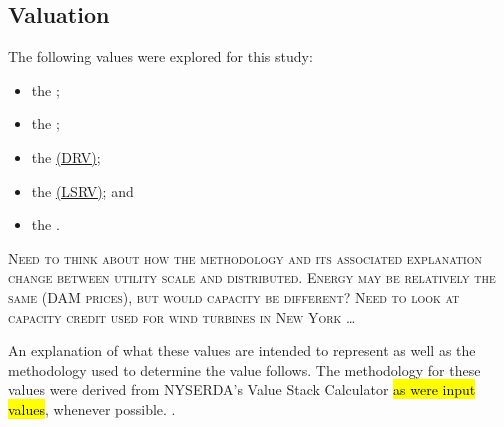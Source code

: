 
\subsection{Valuation}
\label{meth_val}
The following values were explored for this study: 

\begin{itemize}
	\item the \hyperref[meth_val_aev]{\aev{}}; 
	\item the \hyperref[meth_val_aciv]{\aciv{}}; 
	\item the \hyperref[meth_val_drv]{\drv{} (DRV)};
	\item the \hyperref[meth_val_lsrv]{\lsrv{} (LSRV)}; and 
	\item the \hyperref[meth_val_atdlv]{\atdlv{}}. 
\end{itemize}

\vspace*{10mm}
\begin{centering}
\large\textsc{Need to think about how the methodology and its associated explanation change between utility scale and distributed. Energy may be relatively the same (DAM prices), but would capacity be different? Need to look at capacity credit used for wind turbines in New York \ldots}
\end{centering}
\vspace*{10mm}

An explanation of what these values are intended to represent as well as the methodology used to determine the value follows. The methodology for these values were derived from NYSERDA’s Value Stack Calculator \hl{as were input values}, whenever possible. \cite{nypsc_matter_2019}. %




